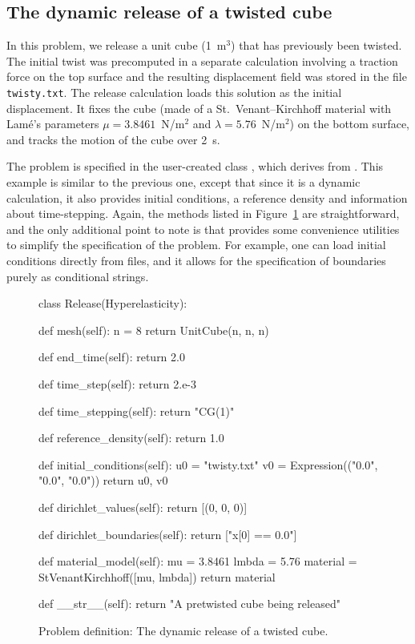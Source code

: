 \subsection{The dynamic release of a twisted cube}

In this problem, we release a unit cube (1~m$^3$) that has previously
been twisted. The initial twist was precomputed in a separate
calculation involving a traction force on the top surface and the
resulting displacement field was stored in the file {\tt
twisty.txt}. The release calculation loads this solution as the
initial displacement. It fixes the cube (made of a
St.~Venant--Kirchhoff material with Lam\'e's parameters $\mu =
3.8461$~N/m$^2$ and $\lambda = 5.76$~N/m$^2$) on the bottom surface,
and tracks the motion of the cube over 2~s.

The problem is specified in the user-created class ,
which derives from . This example is similar to
the previous one, except that since it is a dynamic calculation, it also
provides initial conditions, a reference density and information about
time-stepping. Again, the methods listed in
Figure~\ref{code:narayanan:dynamicrelease} are straightforward, and
the only additional point to note is that \twist{} provides some
convenience utilities to simplify the specification of the
problem. For example, one can load initial conditions directly from
files, and it allows for the specification of boundaries purely as
conditional strings.

\begin{figure}
\begin{python}
class Release(Hyperelasticity):

    def mesh(self):
        n = 8
        return UnitCube(n, n, n)

    def end_time(self):
        return 2.0

    def time_step(self):
        return 2.e-3

    def time_stepping(self):
        return "CG(1)"

    def reference_density(self):
        return 1.0

    def initial_conditions(self):
        u0 = "twisty.txt"
        v0 = Expression(("0.0", "0.0", "0.0"))
        return u0, v0

    def dirichlet_values(self):
        return [(0, 0, 0)]

    def dirichlet_boundaries(self):
        return ["x[0] == 0.0"]

    def material_model(self):
        mu    = 3.8461
        lmbda = 5.76
        material = StVenantKirchhoff([mu, lmbda])
        return material

    def __str__(self):
        return "A pretwisted cube being released"
\end{python}
\caption{Problem definition: The dynamic release of a twisted cube.}
\label{code:narayanan:dynamicrelease}
\end{figure}

